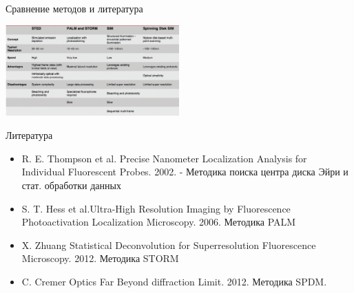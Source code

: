 \documentclass[9pt, compress, xcolor=table]{beamer}
\begin{document}
\begin{frame}{Сравнение методов и литература}
    
\begin{center}
\includegraphics[width=0.5\textwidth]{comp}
\end{center}

 \begin{block}{Литература} \begin{itemize}
\item R. E. Thompson et al. Precise Nanometer Localization Analysis for Individual Fluorescent Probes. 2002. - Методика поиска центра диска Эйри и стат. обработки данных
\item S. T. Hess et al.Ultra-High Resolution Imaging by Fluorescence Photoactivation Localization Microscopy. 2006. Методика PALM
\item X. Zhuang Statistical Deconvolution for Superresolution Fluorescence Microscopy. 2012. Методика STORM
\item C. Cremer Optics Far Beyond diffraction Limit. 2012. Методика SPDM.
\end{itemize}
\end{block}
\end{frame}
\end{document}
